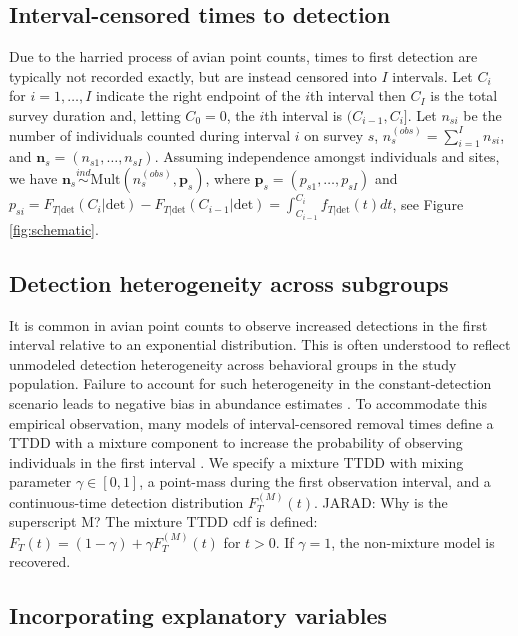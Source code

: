 \documentclass[12pt]{article}
\newcommand{\jarad}[1]{{\color{Orange} JARAD: #1}}
\newcommand{\vn}{\textbf{n}}
\newcommand{\vp}{\textbf{p}}
\newcommand{\Mult}{\mbox{Mult}}
\newcommand{\ind}{\stackrel{ind}{\sim}}
\newcommand{\Fm}{F_T^{(M)}}
\newcommand{\dt}{\text{det}}
\newcommand{\nobs}{n^{(obs)}}
\begin{document}
\subsection{Interval-censored times to detection} \label{s:interval}

Due to the harried process of avian point counts, times to first detection are typically not recorded exactly, but are instead censored into $I$ intervals. 
Let $C_i$ for $i=1,\dots,I$ indicate the right endpoint of the $i$th interval then $C_I$ is the total survey duration and, letting $C_0=0$, the $i$th interval is $(C_{i-1},C_{i}]$. 
Let $n_{si}$ be the number of individuals counted during interval $i$ on survey $s$, $\nobs_s = \sum_{i=1}^I n_{si}$, and $\vn_{s}=(n_{s1},\dots,n_{sI})$.
Assuming independence amongst individuals and sites, we have $\vn_{s} \ind \Mult \left(\nobs_s, \vp_{s}\right)$, where $\vp_{s}=(p_{s1},\dots,p_{sI})$ and $p_{si} = F_{T|\dt}(C_i|\dt) - F_{T|\dt}(C_{i-1}|\dt) = \int_{C_{i-1}}^{C_i} f_{T|\dt}(t) dt$, 
see Figure \ref{fig:schematic}.  

\subsection{Detection heterogeneity across subgroups} \label{s:subgroups}

It is common in avian point counts to observe increased detections in the first interval relative to an exponential distribution.
This is often understood to reflect unmodeled detection heterogeneity across behavioral groups in the study population.
Failure to account for such heterogeneity in the constant-detection scenario leads to negative bias in abundance estimates \citep{Otis1978}.
To accommodate this empirical observation, many models of interval-censored removal times define a TTDD with a mixture component to increase the probability of observing individuals in the first interval \citep{Farnsworth2002, Royle2004Generalized, Farnsworth2005, Alldredge2007, Etterson2009, Reidy2011}.
We specify a mixture TTDD with mixing parameter $\gamma\in[0,1]$, a point-mass during the first observation interval, and a continuous-time detection distribution $\Fm(t)$. \jarad{Why is the superscript M?}  
The mixture TTDD cdf is defined: $F_T(t) = (1-\gamma) + \gamma \Fm(t)$ for $t>0$.
If $\gamma=1$, the non-mixture model is recovered.





\subsection{Incorporating explanatory variables}\label{sec:covariates}
\end{document}
